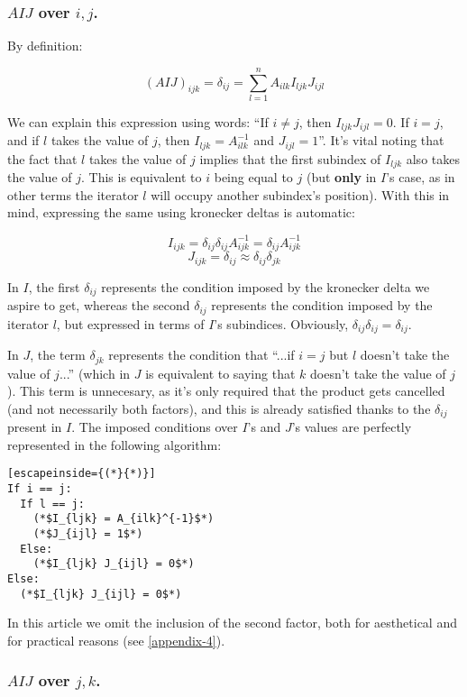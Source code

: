 \subsubsection{$AIJ$ over $i, j$.}

By definition:

$$(AIJ)_{ijk} = \delta_{ij} = \sum\limits^{n}_{l = 1} A_{ilk} I_{ljk} J_{ijl}$$

We can explain this expression using words: ``If $i \neq j$, then $I_{ljk} J_{ijl} = 0$. If $i = j$, and if $l$ takes the value of $j$, then $I_{ljk} = A^{-1}_{ilk}$ and $J_{ijl} = 1$''. It's vital noting that the fact that $l$ takes the value of $j$ implies that the first subindex of $I_{ljk}$ also takes the value of $j$. This is equivalent to $i$ being equal to $j$ (but \textbf{only} in $I$'s case, as in other terms the iterator $l$ will occupy another subindex's position). With this in mind, expressing the same using kronecker deltas is automatic:

$$I_{ijk} = \delta_{ij} \delta_{ij} A_{ijk}^{-1} = \delta_{ij} A_{ijk}^{-1}$$
$$J_{ijk} = \delta_{ij} \approx \delta_{ij} \delta_{jk}$$

In $I$, the first $\delta_{ij}$ represents the condition imposed by the kronecker delta we aspire to get, whereas the second $\delta_{ij}$ represents the condition imposed by the iterator $l$, but expressed in terms of $I$'s subindices. Obviously, $\delta_{ij} \delta_{ij} = \delta_{ij}$.

In $J$, the term $\delta_{jk}$ represents the condition that ``...if $i = j$ but $l$ doesn't take the value of $j$...'' (which in $J$ is equivalent to saying that $k$ doesn't take the value of $j$). This term is unnecesary, as it's only required that the product gets cancelled (and not necessarily both factors), and this is already satisfied thanks to the $\delta_{ij}$ present in $I$. The imposed conditions over $I$'s and $J$'s values are perfectly represented in the following algorithm:

\begin{lstlisting}[escapeinside={(*}{*)}]
If i == j:
  If l == j:
    (*$I_{ljk} = A_{ilk}^{-1}$*)
    (*$J_{ijl} = 1$*)
  Else:
    (*$I_{ljk} J_{ijl} = 0$*)
Else:
  (*$I_{ljk} J_{ijl} = 0$*)	
\end{lstlisting}

In this article we omit the inclusion of the second factor, both for aesthetical and for practical reasons (see \ref{appendix-4}).

\subsubsection{$AIJ$ over $j, k$.}

